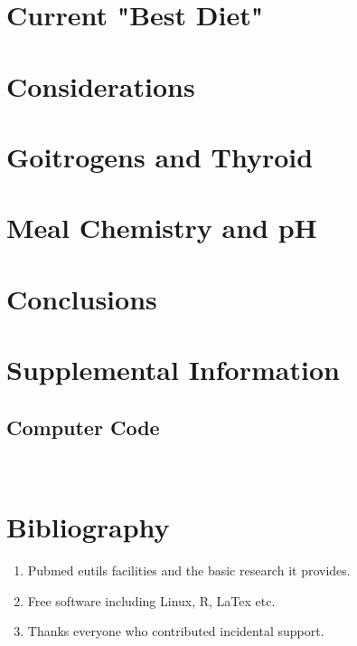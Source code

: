 \section{ Current "Best Diet"   }

\section{  Considerations  }

\section{  Goitrogens and Thyroid  }


\section{  Meal Chemistry and pH  }

\section{Conclusions}


\section{Supplemental Information}

\subsection{Computer Code}


\begin{lstlisting}


\end{lstlisting}
\section{Bibliography}






\begin{acknowledgments} 

% 
\begin{enumerate}
\item Pubmed eutils facilities and the basic research it provides. 
\item Free software including Linux, R, LaTex  etc.
\item Thanks everyone who contributed incidental support. 
\end{enumerate}

\end{acknowledgments}


